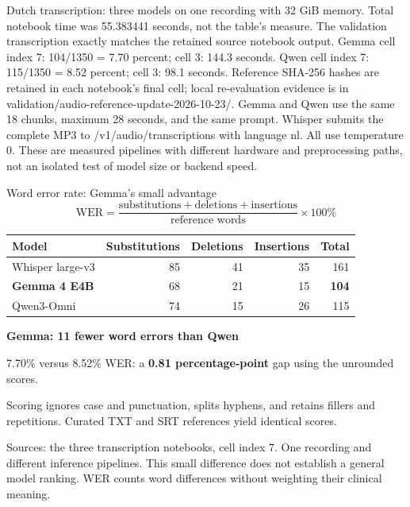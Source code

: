 \documentclass[aspectratio=169,12pt]{beamer}
\newcommand{\source}[1]{\par\vfill{\fontsize{7}{8.5}\selectfont\color{black!65}#1\par}}
\newcommand{\lead}[1]{{\usebeamercolor[fg]{structure}\bfseries #1}}
\begin{document}
\begin{frame}{Dutch transcription: three models on one recording}
{with 32 GiB memory. Total notebook time was 55.383441 seconds, not the table's measure.
The validation transcription exactly matches the retained source notebook output.
Gemma cell index 7: 104/1350 = 7.70 percent; cell 3: 144.3 seconds.
Qwen cell index 7: 115/1350 = 8.52 percent; cell 3: 98.1 seconds.
Reference SHA-256 hashes are retained in each notebook's final cell;
local re-evaluation evidence is in validation/audio-reference-update-2026-10-23/.
Gemma and Qwen use the same 18 chunks, maximum 28 seconds, and the same prompt.
Whisper submits the complete MP3 to /v1/audio/transcriptions with language nl.
All use temperature 0. These are measured pipelines with different hardware and
preprocessing paths, not an isolated test of model size or backend speed.}
\end{frame}

\begin{frame}{Word error rate: Gemma's small advantage}
\small
\[
\mathrm{WER}=\frac{\text{substitutions}+\text{deletions}+\text{insertions}}
{\text{reference words}}\times100\%
\]
\centering
\begin{tabular}{@{}lrrrr@{}}
\toprule
\textbf{Model} & \textbf{Substitutions} & \textbf{Deletions} & \textbf{Insertions} & \textbf{Total} \\
\midrule
Whisper large-v3 & 85 & 41 & 35 & 161 \\
\textbf{Gemma 4 E4B} & 68 & 21 & 15 & \textbf{104} \\
Qwen3-Omni & 74 & 15 & 26 & 115 \\
\bottomrule
\end{tabular}
\par\bigskip
\raggedright
\lead{Gemma: 11 fewer word errors than Qwen}\par
7.70\% versus 8.52\% WER: a \textbf{0.81 percentage-point} gap
using the unrounded scores.
\par\medskip

Scoring ignores case and punctuation, splits hyphens, and retains fillers
and repetitions. Curated TXT and SRT references yield identical scores.
\source{Sources: the three transcription notebooks, cell index 7. One recording and different
inference pipelines. This small difference does not establish a general model ranking.
WER counts word differences without weighting their clinical meaning.}
\end{frame}
\end{document}
